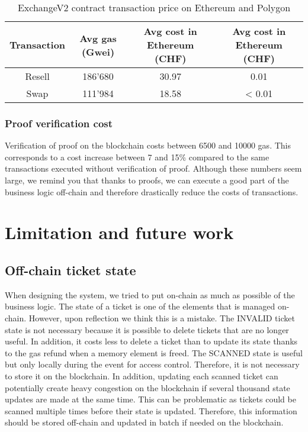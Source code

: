\documentclass[a4paper,11pt,oneside]{report}
\begin{document}
\begin{table}[h!]
\begin{center}
\begin{NiceTabular}{ |c||c|c|c| }
 \hline
 Transaction & Avg gas (Gwei) & Avg cost in Ethereum (CHF) & Avg cost in Ethereum (CHF) \\
 \hline \hline
 Resell & 186'680 & 30.97 & 0.01 \\
 Swap & 111'984 & 18.58 & < 0.01 \\
 \hline
\end{NiceTabular}
\caption{ExchangeV2 contract transaction price on Ethereum and Polygon}
\label{table:exchangeV2_contract_transaction_cost}
\end{center}
\end{table}

\subsection{Proof verification cost}
Verification of proof on the blockchain costs between 6500 and 10000 gas. This corresponds to a cost increase between 7 and 15\% compared to the same transactions executed without verification of proof. Although these numbers seem large, we remind you that thanks to proofs, we can execute a good part of the business logic off-chain and therefore drastically reduce the costs of transactions.

\chapter{Limitation and future work}

\section{Off-chain ticket state}
When designing the system, we tried to put on-chain as much as possible of the business logic. The state of a ticket is one of the elements that is managed on-chain. However, upon reflection we think this is a mistake. The INVALID ticket state is not necessary because it is possible to delete tickets that are no longer useful. In addition, it costs less to delete a ticket than to update its state thanks to the gas refund when a memory element is freed. The SCANNED state is useful but only locally during the event for access control. Therefore, it is not necessary to store it on the blockchain. In addition, updating each scanned ticket can potentially create heavy congestion on the blockchain if several thousand state updates are made at the same time. This can be problematic as tickets could be scanned multiple times before their state is updated. Therefore, this information should be stored off-chain and updated in batch if needed on the blockchain. 
\end{document}
